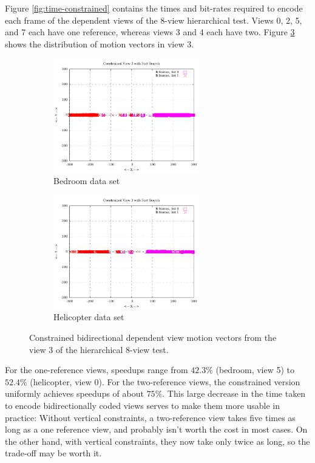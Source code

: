 \documentclass{sig-alternate-05-2015}
\begin{document}
Figure \ref{fig:time-constrained} contains the times and bit-rates required
to encode each frame of the dependent views of the 8-view hierarchical test.
Views 0, 2, 5, and 7 each have one reference, whereas views 3 and 4 each have
two. Figure \ref{fig:inter-view-constrained-bimvs1} shows the distribution of
motion vectors in view 3.

\begin{figure}[h]
\centering
\begin{subfigure}{.5\textwidth}
\centering
\includegraphics[width=2.5in]{figures/bedroom1-inter-view-constrained-bimvs1.pdf}
\caption{Bedroom data set}
\label{fig:bedroom-inter-view-constrained-bimvs1}
\end{subfigure} \hspace{4pt}
\begin{subfigure}{.5\textwidth}
\centering
\includegraphics[width=2.5in]{figures/helicopter-inter-view-constrained-bimvs1.pdf}
\caption{Helicopter data set}
\label{fig:helicopter-inter-view-constrained-bimvs1}
\end{subfigure}
\caption{Constrained bidirectional dependent view motion vectors from the view 3
of the hierarchical 8-view test.}
\label{fig:inter-view-constrained-bimvs1}
\end{figure}

For the one-reference views, speedups range from $42.3\%$ (bedroom, view 5) to
$52.4\%$ (helicopter, view 0). For the two-reference views, the
constrained version uniformly achieves speedups of about $75\%$. This large
decrease in the time taken to encode bidirectionally coded views serves to
make them more usable in practice: Without vertical constraints, a
two-reference view takes five times as long as a one reference view, and
probably isn't worth the cost in most cases. On the other hand, with vertical
constraints, they now take only twice as long, so the trade-off may be worth it.
\end{document}
